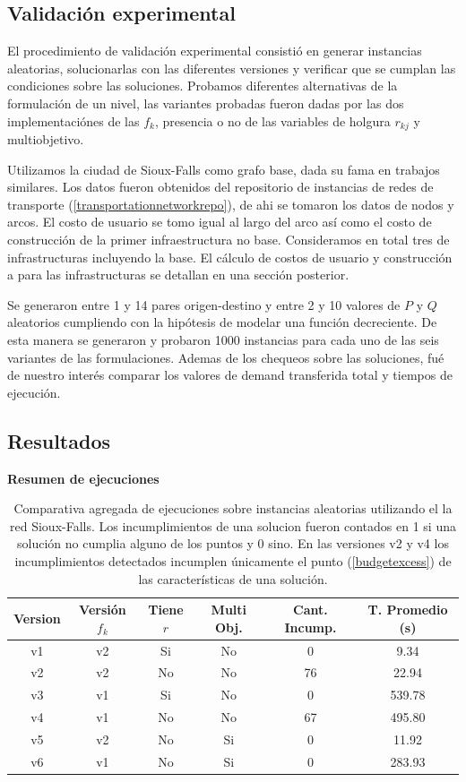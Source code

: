 \documentclass{article}
\begin{document}
  \subsection{Validación experimental}

  El procedimiento de validación experimental consistió en generar instancias aleatorias, solucionarlas con las diferentes versiones y verificar que se cumplan las condiciones sobre las soluciones.
  Probamos diferentes alternativas de la formulación de un nivel, las variantes probadas fueron dadas por las dos implementaciónes de las $f_k$, presencia o no de las variables de holgura $r_{kj}$ y multiobjetivo.

  Utilizamos la ciudad de Sioux-Falls como grafo base, dada su fama en trabajos similares. Los datos fueron obtenidos del repositorio de instancias de redes de transporte (\ref{transportationnetworkrepo}), de ahi se tomaron los datos de nodos y arcos. El costo de usuario se tomo igual al largo del arco así como el costo de construcción de la primer infraestructura no base. Consideramos en total tres de infrastructuras incluyendo la base. El cálculo de costos de usuario y construcción a para las infrastructuras se detallan en una sección posterior.

  Se generaron entre 1 y 14 pares origen-destino y entre 2 y 10 valores de $P$ y $Q$ aleatorios cumpliendo con la hipótesis de modelar una función decreciente.
  De esta manera se generaron y probaron 1000 instancias para cada uno de las seis variantes de las formulaciones. Ademas de los chequeos sobre las soluciones, fué de nuestro interés comparar los valores de demand transferida total y tiempos de ejecución.

  \subsection{Resultados}

  \begin{table}[h!]
    \centering
    \caption*{{\bf Resumen de ejecuciones}}
    \begin{tabular}{cccccc}
      \toprule
      Version & Versión $f_k$ & Tiene $r$ & Multi Obj. & Cant. Incump. & T. Promedio (s) \\
      \midrule
      v1 & v2 & Si & No & 0   & 9.34    \\
      v2 & v2 & No & No & 76  & 22.94   \\
      v3 & v1 & Si & No & 0   & 539.78  \\
      v4 & v1 & No & No & 67  & 495.80  \\
      v5 & v2 & No & Si & 0   & 11.92   \\
      v6 & v1 & No & Si & 0   & 283.93  \\
      \bottomrule
    \end{tabular}
    \caption{Comparativa agregada de ejecuciones sobre instancias aleatorias utilizando el la red Sioux-Falls. Los incumplimientos de una solucion fueron contados en 1 si una solución no cumplia alguno de los puntos y 0 sino. En las versiones v2 y v4 los incumplimientos detectados incumplen únicamente el punto (\ref{budgetexcess}) de las características de una solución.}\label{table:resumenejecuciones}
  \end{table}
\end{document}

